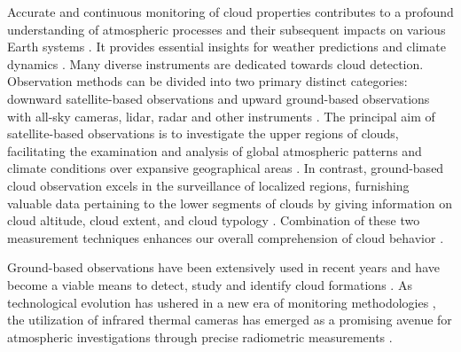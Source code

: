 \documentclass[amt, article]{copernicus}
\begin{document}
Accurate and continuous monitoring of cloud properties contributes to a profound understanding of atmospheric processes and their subsequent impacts on various Earth systems \citep{liou1992radiation}. It provides essential insights for weather predictions and climate dynamics \citep{hu2004application,petzold2015global}.
Many diverse instruments are dedicated towards cloud detection. Observation methods can be divided into two primary distinct categories: downward satellite-based observations \citep{roy2017satellite, martin2008satellite} and upward ground-based observations with all-sky cameras, lidar, radar and other instruments \citep{wilczak1996ground}. The principal aim of satellite-based observations is to investigate the upper regions of clouds, facilitating the examination and analysis of global atmospheric patterns and climate conditions over expansive geographical areas \citep{schiffer1983international, boers2006satellite, geer2017growing, varnai2018satellite}. In contrast, ground-based cloud observation excels in the surveillance of localized regions, furnishing valuable data pertaining to the lower segments of clouds by giving information on cloud altitude, cloud extent, and cloud typology \citep{bower2000ace, zhou2019cloud}. Combination of these two measurement techniques enhances our overall comprehension of cloud behavior \citep{mokhov1994analysis, schreiner1993comparison, yamashita2012ground, yoshimura2013contribution}.

Ground-based observations have been extensively used in recent years and have become a viable means to detect, study and identify cloud formations \citep{paczynski2000monitoring, skidmore2008using, tzoumanikas2016effect, ugolnikov2017noctilucent, Mommert2020, tzoumanikas2016effect, roman2022retrieval}. As technological evolution has ushered in a new era of monitoring methodologies \citep{mandat2014all}, the utilization of infrared thermal cameras has emerged as a promising avenue for atmospheric investigations through precise radiometric measurements \citep{Szejwach1982, Shaw_2013, liandrat2017cloud, lopez2017contribution, Klebe2014, nikolenko2021infrared}.
\end{document}
